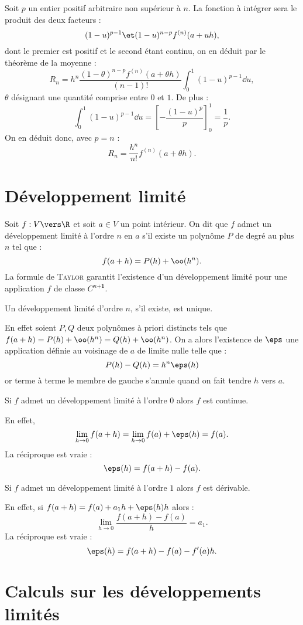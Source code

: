 \documentclass{mybourbaki}
\begin{document}
\propt{} Soit $p$ un entier positif arbitraire non supérieur à $n$. La fonction à intégrer sera le produit des deux facteurs : \[(1-u)^{p-1} \et (1-u)^{n-p}f^{(n)}(a+uh), \]dont le premier est positif et le second étant continu, on en déduit par le théorème de la moyenne : \[ R_n = h^{n}\frac{(1-\theta)^{n-p}f^{(n)}(a+\theta h)}{(n-1)!}\int_{0}^{1}(1-u)^{p-1}\dd u,\]$\theta$ désignant une quantité comprise entre $0$ et $1$. De plus : \[ \int_{0}^{1} (1-u)^{p-1}\dd u = \left[ -\frac{(1-u)^{p}}{p}\right]^{1}_0 = \frac{1}{p}.\]On en déduit donc, avec $p=n$ : \[ R_n = \frac{h^{n}}{n!}f^{(n)}(a+\theta h).\]

\section*{Développement limité}

\propt{} Soit $f: V \vers \R$ et soit $a\in V$ un point intérieur. On dit que $f$ admet un développement limité à l'ordre $n$ en $a$ s'il existe un polynôme $P$ de degré au plus $n$ tel que : \[ f(a+h) = P(h) + \oo(h^{n}).\]
La formule de \textsc{Taylor} garantit l'existence d'un développement limité pour une application $f$ de classe $C^{n\boldsymbol{+1}}$.

\propt{}Un développement limité d'ordre $n$, s'il existe, est unique.

En effet soient $P,Q$ deux polynômes à priori distincts tels que $f(a+h) = P(h) + \oo(h^{n}) = Q(h) + \oo(h^{n})$. On a alors l'existence de $\eps$ une application définie au voisinage de $a$ de limite nulle telle que : \[ P(h) - Q(h) = h^{n}\eps(h)\]or terme à terme le membre de gauche s'annule quand on fait tendre $h$ vers $a$.

\bigbreak

Si $f$ admet un développement limité à l'ordre $0$ alors $f$ est continue.

En effet, \[\lim_{h\to 0}f(a+h) = \lim_{h\to 0}f(a) + \eps(h) = f(a). \]
La réciproque est vraie : \[ \eps(h) = f(a+h) - f(a).\]

Si $f$ admet un développement limité à l'ordre $1$ alors $f$ est dérivable.

En effet, si $f(a+h) = f(a) + a_1 h + \eps(h)h$ alors : \[ \lim_{h\to 0}\frac{f(a+h) - f(a)}{h} = a_1.\]
La réciproque est vraie : \[ \eps(h) = f(a+h) - f(a) - f'(a)h.\]

\section*{Calculs sur les développements limités}
\end{document}
